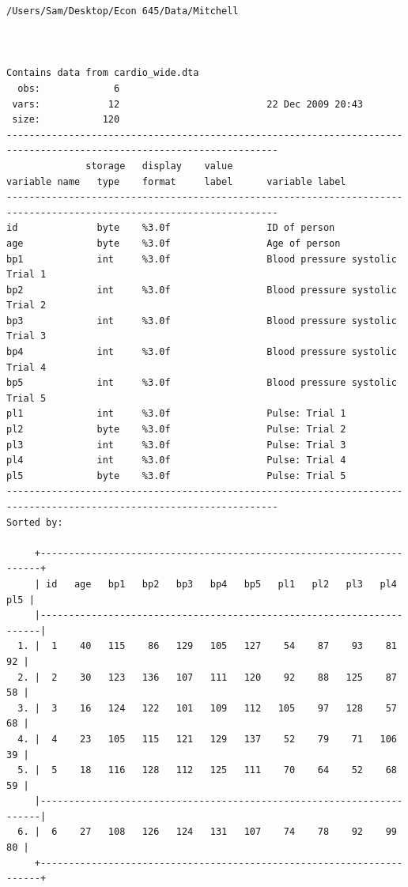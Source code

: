 \documentclass[
]{book}
\begin{document}
\begin{verbatim}
/Users/Sam/Desktop/Econ 645/Data/Mitchell



Contains data from cardio_wide.dta
  obs:             6                          
 vars:            12                          22 Dec 2009 20:43
 size:           120                          
----------------------------------------------------------------------------------------------------------------------
              storage   display    value
variable name   type    format     label      variable label
----------------------------------------------------------------------------------------------------------------------
id              byte    %3.0f                 ID of person
age             byte    %3.0f                 Age of person
bp1             int     %3.0f                 Blood pressure systolic Trial 1
bp2             int     %3.0f                 Blood pressure systolic Trial 2
bp3             int     %3.0f                 Blood pressure systolic Trial 3
bp4             int     %3.0f                 Blood pressure systolic Trial 4
bp5             int     %3.0f                 Blood pressure systolic Trial 5
pl1             int     %3.0f                 Pulse: Trial 1
pl2             byte    %3.0f                 Pulse: Trial 2
pl3             int     %3.0f                 Pulse: Trial 3
pl4             int     %3.0f                 Pulse: Trial 4
pl5             byte    %3.0f                 Pulse: Trial 5
----------------------------------------------------------------------------------------------------------------------
Sorted by: 

     +----------------------------------------------------------------------+
     | id   age   bp1   bp2   bp3   bp4   bp5   pl1   pl2   pl3   pl4   pl5 |
     |----------------------------------------------------------------------|
  1. |  1    40   115    86   129   105   127    54    87    93    81    92 |
  2. |  2    30   123   136   107   111   120    92    88   125    87    58 |
  3. |  3    16   124   122   101   109   112   105    97   128    57    68 |
  4. |  4    23   105   115   121   129   137    52    79    71   106    39 |
  5. |  5    18   116   128   112   125   111    70    64    52    68    59 |
     |----------------------------------------------------------------------|
  6. |  6    27   108   126   124   131   107    74    78    92    99    80 |
     +----------------------------------------------------------------------+
\end{verbatim}
\end{document}

